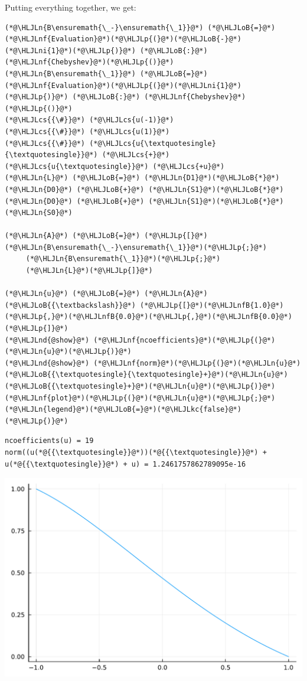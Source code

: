\documentclass[12pt,a4paper]{article}
\newcommand{\HLJLkc}[1]{\textcolor[RGB]{59,151,46}{\textit{#1}}}
\newcommand{\HLJLn}[1]{#1}
\newcommand{\HLJLnd}[1]{\textcolor[RGB]{214,102,97}{#1}}
\newcommand{\HLJLnf}[1]{\textcolor[RGB]{66,102,213}{#1}}
\newcommand{\HLJLnfB}[1]{\textcolor[RGB]{59,151,46}{#1}}
\newcommand{\HLJLni}[1]{\textcolor[RGB]{59,151,46}{#1}}
\newcommand{\HLJLoB}[1]{\textcolor[RGB]{102,102,102}{\textbf{#1}}}
\newcommand{\HLJLp}[1]{#1}
\newcommand{\HLJLcs}[1]{\textcolor[RGB]{153,153,119}{\textit{#1}}}
\begin{document}
Putting everything together, we get:


\begin{lstlisting}
(*@\HLJLn{B\ensuremath{\_-}\ensuremath{\_1}}@*) (*@\HLJLoB{=}@*) (*@\HLJLnf{Evaluation}@*)(*@\HLJLp{(}@*)(*@\HLJLoB{-}@*)(*@\HLJLni{1}@*)(*@\HLJLp{)}@*) (*@\HLJLoB{:}@*) (*@\HLJLnf{Chebyshev}@*)(*@\HLJLp{()}@*)
(*@\HLJLn{B\ensuremath{\_1}}@*) (*@\HLJLoB{=}@*) (*@\HLJLnf{Evaluation}@*)(*@\HLJLp{(}@*)(*@\HLJLni{1}@*)(*@\HLJLp{)}@*) (*@\HLJLoB{:}@*) (*@\HLJLnf{Chebyshev}@*)(*@\HLJLp{()}@*)
(*@\HLJLcs{{\#}}@*) (*@\HLJLcs{u(-1)}@*)
(*@\HLJLcs{{\#}}@*) (*@\HLJLcs{u(1)}@*)
(*@\HLJLcs{{\#}}@*) (*@\HLJLcs{u{\textquotesingle}{\textquotesingle}}@*) (*@\HLJLcs{+}@*) (*@\HLJLcs{u{\textquotesingle}}@*) (*@\HLJLcs{+u}@*)
(*@\HLJLn{L}@*) (*@\HLJLoB{=}@*) (*@\HLJLn{D1}@*)(*@\HLJLoB{*}@*)(*@\HLJLn{D0}@*) (*@\HLJLoB{+}@*) (*@\HLJLn{S1}@*)(*@\HLJLoB{*}@*)(*@\HLJLn{D0}@*) (*@\HLJLoB{+}@*) (*@\HLJLn{S1}@*)(*@\HLJLoB{*}@*)(*@\HLJLn{S0}@*)

(*@\HLJLn{A}@*) (*@\HLJLoB{=}@*) (*@\HLJLp{[}@*)(*@\HLJLn{B\ensuremath{\_-}\ensuremath{\_1}}@*)(*@\HLJLp{;}@*)
     (*@\HLJLn{B\ensuremath{\_1}}@*)(*@\HLJLp{;}@*)
     (*@\HLJLn{L}@*)(*@\HLJLp{]}@*)

(*@\HLJLn{u}@*) (*@\HLJLoB{=}@*) (*@\HLJLn{A}@*) (*@\HLJLoB{{\textbackslash}}@*) (*@\HLJLp{[}@*)(*@\HLJLnfB{1.0}@*)(*@\HLJLp{,}@*)(*@\HLJLnfB{0.0}@*)(*@\HLJLp{,}@*)(*@\HLJLnfB{0.0}@*)(*@\HLJLp{]}@*)
(*@\HLJLnd{@show}@*) (*@\HLJLnf{ncoefficients}@*)(*@\HLJLp{(}@*)(*@\HLJLn{u}@*)(*@\HLJLp{)}@*)
(*@\HLJLnd{@show}@*) (*@\HLJLnf{norm}@*)(*@\HLJLp{(}@*)(*@\HLJLn{u}@*)(*@\HLJLoB{{\textquotesingle}{\textquotesingle}+}@*)(*@\HLJLn{u}@*)(*@\HLJLoB{{\textquotesingle}+}@*)(*@\HLJLn{u}@*)(*@\HLJLp{)}@*)
(*@\HLJLnf{plot}@*)(*@\HLJLp{(}@*)(*@\HLJLn{u}@*)(*@\HLJLp{;}@*)(*@\HLJLn{legend}@*)(*@\HLJLoB{=}@*)(*@\HLJLkc{false}@*)(*@\HLJLp{)}@*)
\end{lstlisting}

\begin{lstlisting}
ncoefficients(u) = 19
norm((u(*@{{\textquotesingle}}@*))(*@{{\textquotesingle}}@*) + u(*@{{\textquotesingle}}@*) + u) = 1.2461757862789095e-16
\end{lstlisting}

\includegraphics[width=\linewidth]{jl_GsbqQZ/Chapter4_30_1.pdf}
\end{document}
